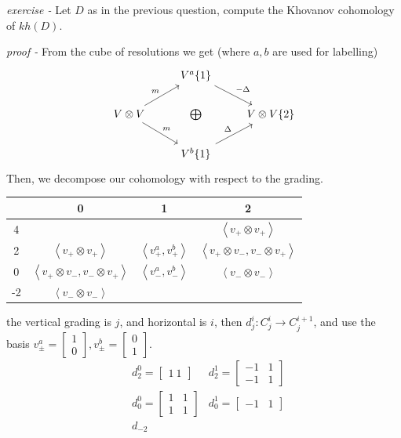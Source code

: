 \documentclass[11pt]{article}
\theoremstyle{definition}
\newcommand{\set}[1]{\{#1\}}
\newcommand{\gen}[1]{\left\langle #1 \right\rangle}
\begin{document}

    \emph{exercise - } Let \(D\) as in the previous question, compute the Khovanov cohomology of \(kh(D)\).

    \emph{proof - } From the cube of resolutions we get (where \(a,b\) are used for labelling)
    \begin{equation*}
        \begin{tikzcd}
            &V^a\set{1} \arrow[rd,"{- \Delta}"]\\
            V\otimes V \arrow[ru,"{m}"] \arrow[rd,"{m}"] &\bigoplus &V\otimes V\set{2} \\
            &V^b\set{1} \arrow[ru,"{\Delta}"]
        \end{tikzcd}
    \end{equation*}
    Then, we decompose our cohomology with respect to the grading.
    \begin{center}
    \begin{tabular}{|c|c|c|c|}
        & 0 & 1 & 2 \\
        \hline
        4 & & & \(\gen{v_+\otimes v_+}\) \\
        \hline
        2 & \(\gen{v_+\otimes v_+}\) & \(\gen{v_+^a, v_+^b}\) & \(\gen{v_+\otimes v_-,v_- \otimes v_+}\) \\
        \hline
        0 & \(\gen{v_+\otimes v_-,v_- \otimes v_+}\) & \(\gen{v_-^a,v_-^b}\) & \(\gen{v_-\otimes v_-}\) \\
        \hline
        -2 & \(\gen{v_-\otimes v_-}\) & & \\
        \hline
    \end{tabular}
    \end{center}
    the vertical grading is \(j\), and horizontal is \(i\), then \(d_j^i:C_j^i \to C_j^{i+1}\), and use the basis \(v^a_\pm = \begin{bmatrix} 1 \\ 0\end{bmatrix}, v^b_\pm = \begin{bmatrix} 0 \\ 1\end{bmatrix}\).
    \begin{align*}
        &d_2^0 = \begin{bmatrix} 1 \ 1 \end{bmatrix} & d_2^1 =\begin{bmatrix} -1 & 1 \\ -1 & 1 \end{bmatrix} \\
        &d_0^0 = \begin{bmatrix} 1&1\\1&1 \end{bmatrix} &d_0^1 = \begin{bmatrix} -1&1 \end{bmatrix} \\
        &d_{-2}
    \end{align*}
\end{document}
